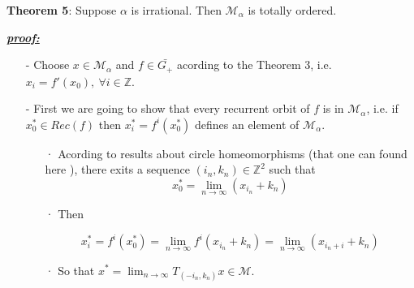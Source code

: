 \documentclass{article}
\begin{document}
	
\noindent \textbf{Theorem 5}: Suppose $\alpha$ is irrational. Then $\mathcal{M}_{\alpha}$ is totally ordered.


\color{blue}
	\noindent \underline{\textbf{\textit{proof:}}} 		

		\begin{itemize}
			\item[-] Choose $x \in \mathcal{M}_{\alpha}$ and $f \in \bar{G_{+}}$ acording to the Theorem 3, i.e. $x_i = f' (x_0), \ \forall i \in \mathbb{Z}$.
			\item[-] First we are going to show that every recurrent orbit of $f$ is in $\mathcal{M}_{\alpha}$, i.e. if $x_{0}^{*} \in Rec(f)$ then $x_{i}^{*} = f^{i} (x_{0}^{*} )$ defines an element of $\mathcal{M}_{\alpha}$.
			
				\begin{itemize}
					\item[·] Acording to results about circle homeomorphisms (that one can found here \cite{R1}), there exits a sequence $( i_n, k_n ) \in \mathbb{Z}^{2}$ such that
						$$
							x_{0}^{*} = \lim_{n \rightarrow \infty} ( x_{i_n} + k_{n} )
						$$
						
					\item[·] Then
					
						$$
							x_{i}^{*} = f^{i} ( x_{0}^{*} ) = \lim_{n \rightarrow 	\infty} f^{i} ( x_{i_n} + k_n ) = \lim_{n \rightarrow 	\infty} ( x_{i_n + i} + k_n )
						$$
					\item[·] So that $x^{*} = \lim_{n \rightarrow \infty} T_{(-i_n, k_n)} x \in \mathcal{M}$.
				\end{itemize}
				

\end{itemize}
\end{document}
